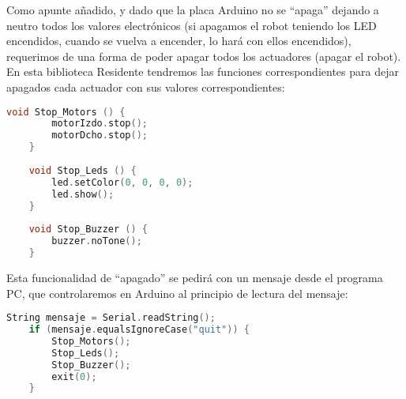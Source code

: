 \par Como apunte añadido, y dado que la placa Arduino no se ``apaga'' dejando a neutro todos los valores electrónicos (si apagamos el robot teniendo los LED encendidos, cuando se vuelva a encender, lo hará con ellos encendidos), requerimos de una forma de poder apagar todos los actuadores (apagar el robot). En esta biblioteca Residente tendremos las funciones correspondientes para dejar apagados cada actuador con sus valores correspondientes:

\begin{lstlisting}[language=C,caption={Apagado de los actuadores}]
	void Stop_Motors () {
		motorIzdo.stop();
		motorDcho.stop();
	}
	
	void Stop_Leds () {
		led.setColor(0, 0, 0, 0);
		led.show();
	}
	
	void Stop_Buzzer () {
		buzzer.noTone();
	}	
\end{lstlisting}

Esta funcionalidad de ``apagado'' se pedirá con un mensaje desde el programa PC, que controlaremos en Arduino al principio de lectura del mensaje:

\begin{lstlisting}[language=C,caption={Apagado de los actuadores}]
	String mensaje = Serial.readString();
	if (mensaje.equalsIgnoreCase("quit")) {
		Stop_Motors();
		Stop_Leds();
		Stop_Buzzer();
		exit(0);
	}
\end{lstlisting}

